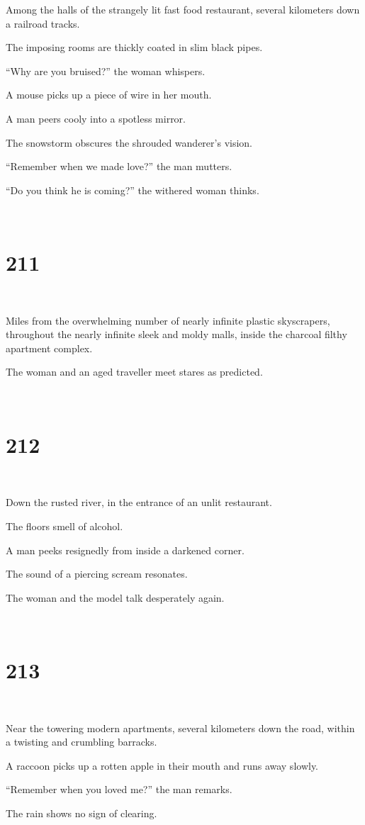 \documentclass{report}
\begin{document}
Among the halls of the strangely lit fast food restaurant, several kilometers down a railroad tracks.

The imposing rooms are thickly coated in slim black pipes.

``Why are you bruised?'' the woman whispers.

A mouse picks up a piece of wire in her mouth.

A man peers cooly into a spotless mirror.

The snowstorm obscures the shrouded wanderer's vision.

``Remember when we made love?'' the man mutters.

``Do you think he is coming?'' the withered woman thinks.

~
\chapter*{211}
~

Miles from the overwhelming number of nearly infinite plastic skyscrapers, throughout the nearly infinite sleek and moldy malls, inside the charcoal filthy apartment complex.

The woman and an aged traveller meet stares as predicted.

~
\chapter*{212}
~

Down the rusted river, in the entrance of an unlit restaurant.

The floors smell of alcohol.

A man peeks resignedly from inside a darkened corner.

The sound of a piercing scream resonates.

The woman and the model talk desperately again.

~
\chapter*{213}
~

Near the towering modern apartments, several kilometers down the road, within a twisting and crumbling barracks.

A raccoon picks up a rotten apple in their mouth and runs away slowly.

``Remember when you loved me?'' the man remarks.

The rain shows no sign of clearing.
\end{document}
